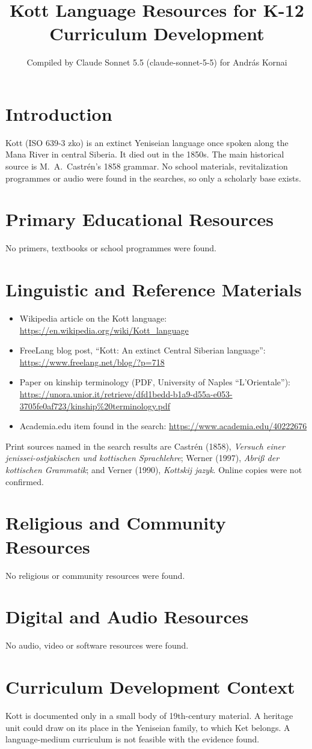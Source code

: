 \documentclass[12pt]{article}
\title{Kott Language Resources for K-12 Curriculum Development}
\author{Compiled by Claude Sonnet 5.5 (claude-sonnet-5-5) for Andr\'as Kornai}
\date{}
\begin{document}
\maketitle

\section{Introduction}
Kott (ISO 639-3 zko) is an extinct Yeniseian language once spoken along the Mana River in central Siberia. It died out in the 1850s. The main historical source is M.~A.~Castr\'en's 1858 grammar. No school materials, revitalization programmes or audio were found in the searches, so only a scholarly base exists.

\section{Primary Educational Resources}
No primers, textbooks or school programmes were found.

\section{Linguistic and Reference Materials}
\begin{itemize}
\item Wikipedia article on the Kott language: \url{https://en.wikipedia.org/wiki/Kott_language}
\item FreeLang blog post, ``Kott: An extinct Central Siberian language'': \url{https://www.freelang.net/blog/?p=718}
\item Paper on kinship terminology (PDF, University of Naples ``L'Orientale''): \url{https://unora.unior.it/retrieve/dfd1bedd-b1a9-d55a-e053-3705fe0af723/kinship%20terminology.pdf}
\item Academia.edu item found in the search: \url{https://www.academia.edu/40222676}
\end{itemize}
Print sources named in the search results are Castr\'en (1858), \emph{Versuch einer jenissei-ostjakischen und kottischen Sprachlehre}; Werner (1997), \emph{Abri\ss{} der kottischen Grammatik}; and Verner (1990), \emph{Kottskij jazyk}. Online copies were not confirmed.

\section{Religious and Community Resources}
No religious or community resources were found.

\section{Digital and Audio Resources}
No audio, video or software resources were found.

\section{Curriculum Development Context}
Kott is documented only in a small body of 19th-century material. A heritage unit could draw on its place in the Yeniseian family, to which Ket belongs. A language-medium curriculum is not feasible with the evidence found.
\end{document}

